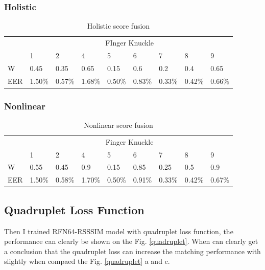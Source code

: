 \subsubsection{Holistic}

\begin{table}[h]
    \centering
    \caption{Holistic score fusion}
    \begin{tabular}{lllllllll}
    \hline
        & \multicolumn{8}{c}{FInger Knuckle}                                    \\
        & 1      & 2      & 4      & 5      & 6      & 7      & 8      & 9      \\ \hline
    W   & 0.45   & 0.35   & 0.65   & 0.15   & 0.6    & 0.2    & 0.4    & 0.65   \\
    EER & 1.50\% & 0.57\% & 1.68\% & 0.50\% & 0.83\% & 0.33\% & 0.42\% & 0.66\% \\ \hline
    \end{tabular}
    \end{table}
\subsubsection{Nonlinear}

\begin{table}[h]
    \centering
    \caption{Nonlinear score fusion}
    \begin{tabular}{lllllllll}
    \hline
        & \multicolumn{8}{c}{Finger Knuckle}                                    \\
        & 1      & 2      & 4      & 5      & 6      & 7      & 8      & 9      \\ \hline
    W   & 0.55   & 0.45   & 0.9    & 0.15   & 0.85   & 0.25   & 0.5    & 0.9    \\
    EER & 1.50\% & 0.58\% & 1.70\% & 0.50\% & 0.91\% & 0.33\% & 0.42\% & 0.67\% \\ \hline
    \end{tabular}
    \end{table}

\subsection{Quadruplet Loss Function}
Then I trained RFN64-RSSSIM model with quadruplet loss function, the performance can clearly be shown on the Fig. \ref{quadruplet}. When can clearly get a conclusion that the quadruplet loss can increase the matching performance with slightly when compaed the Fig. \ref{quadruplet} a and c.

